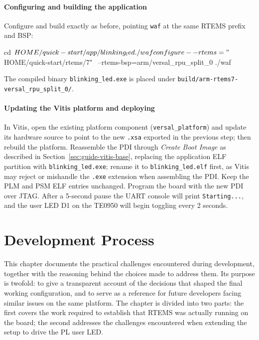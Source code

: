 \documentclass[
	a4paper,
]{CSMakotoTechnicalReport}
\begin{document}
\paragraph*{Configuring and building the application}

Configure and build exactly as before, pointing \texttt{waf} at the same RTEMS prefix and BSP:

\begin{bashcode}
cd $HOME/quick-start/app/blinking_led
./waf configure --rtems="$HOME/quick-start/rtems/7" \
                --rtems-bsp=arm/versal_rpu_split_0
./waf
\end{bashcode}

The compiled binary \texttt{blinking\_led.exe} is placed under \texttt{build/arm-rtems7-versal\_rpu\_split\_0/}.

\paragraph*{Updating the Vitis platform and deploying}

In Vitis, open the existing platform component (\texttt{versal\_platform}) and update its hardware source to point to the new \texttt{.xsa} exported in the previous step; then rebuild the platform.
Reassemble the PDI through \textit{Create Boot Image} as described in Section~\ref{sec:guide-vitis-base}, replacing the application ELF partition with \texttt{blinking\_led.exe}; rename it to \texttt{blinking\_led.elf} first, as Vitis may reject or mishandle the \texttt{.exe} extension when assembling the PDI.
Keep the PLM and PSM ELF entries unchanged.
Program the board with the new PDI over JTAG.
After a 5-second pause the UART console will print \texttt{Starting...}, and the user LED D1 on the TE0950 will begin toggling every 2 seconds.


\section{Development Process}
\label{ch:process}

This chapter documents the practical challenges encountered during development, together with the reasoning behind the choices made to address them.
Its purpose is twofold: to give a transparent account of the decisions that shaped the final working configuration, and to serve as a reference for future developers facing similar issues on the same platform.
The chapter is divided into two parts: the first covers the work required to establish that RTEMS was actually running on the board; the second addresses the challenges encountered when extending the setup to drive the PL user LED.
\end{document}
